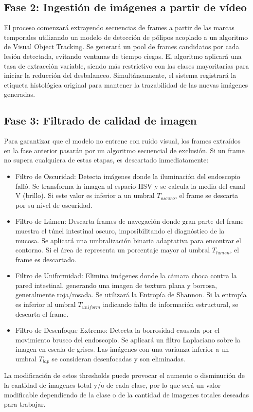﻿\documentclass[10pt,a4paper,twocolumn,twoside]{article}
\begin{document}
\subsection{Fase 2: Ingestión de imágenes a partir de vídeo}
El proceso comenzará extrayendo secuencias de frames a partir de las marcas temporales utilizando un modelo de detección de pólipos acoplado a un algoritmo de Visual Object Tracking. Se generará un pool de frames candidatos por cada lesión detectada, evitando ventanas de tiempo ciegas. El algoritmo aplicará una tasa de extracción variable, siendo más restrictivo con las clases mayoritarias para iniciar la reducción del desbalanceo. Simultáneamente, el sistema registrará la etiqueta histológica original para mantener la trazabilidad de las nuevas imágenes generadas.
\subsection{Fase 3: Filtrado de calidad de imagen}
Para garantizar que el modelo no entrene con ruido visual, los frames extraídos en la fase anterior pasarán por un algoritmo secuencial de exclusión. Si un frame no supera cualquiera de estas etapas, es descartado inmediatamente:
\begin{itemize}
  \item Filtro de Oscuridad: Detecta imágenes donde la iluminación del endoscopio falló. Se transforma la imagen al espacio HSV y se calcula la media del canal V (brillo). Si este valor es inferior a un umbral $T_{oscuro}$, el frame se descarta por su nivel de oscuridad.
  \item Filtro de Lúmen: Descarta frames de navegación donde gran parte del frame muestra el túnel intestinal oscuro, imposibilitando el diagnóstico de la mucosa. Se aplicará una umbralización binaria adaptativa para encontrar el contorno. Si el área de representa un porcentaje mayor al umbral $T_{lumen}$, el frame es descartado.
  \item Filtro de Uniformidad: Elimina imágenes donde la cámara choca contra la pared intestinal, generando una imagen de textura plana y borrosa, generalmente roja/rosada. Se utilizará la Entropía de Shannon. Si la entropía es inferior al umbral $T_{uniform}$ indicando falta de información estructural, se descarta el frame.
  \item Filtro de Desenfoque Extremo: Detecta la borrosidad causada por el movimiento brusco del endoscopio. Se aplicará un filtro Laplaciano sobre la imagen en escala de grises. Las imágenes con una varianza inferior a un umbral $T_{lap}$ se consideran desenfocadas y son eliminadas.
\end{itemize}
La modificación de estos thresholds puede provocar el aumento o disminución de la cantidad de imagenes total y/o de cada clase, por lo que será un valor modificable dependiendo de la clase o de la cantidad de imagenes totales deseadas para trabajar.
\end{document}
